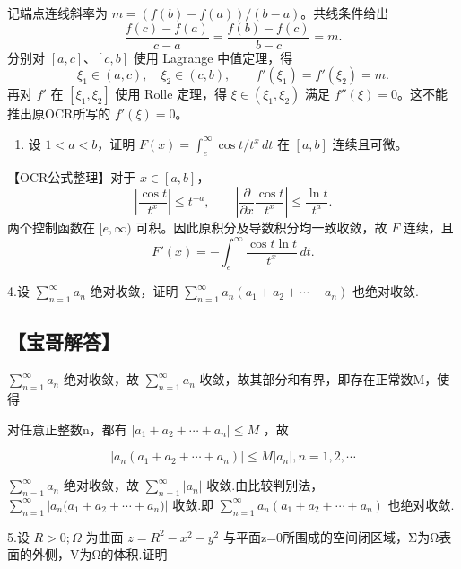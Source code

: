 \documentclass[11pt,fontset=fandol]{ctexart}
\providecommand{\tightlist}{\setlength{\itemsep}{0pt}\setlength{\parskip}{0pt}}
\begin{document}
记端点连线斜率为 \(m=(f(b)-f(a))/(b-a)\)。共线条件给出 \[
\frac{f(c)-f(a)}{c-a}=\frac{f(b)-f(c)}{b-c}=m.
\] 分别对 \([a,c]\)、\([c,b]\) 使用 Lagrange 中值定理，得 \[
\xi_1\in(a,c),\quad\xi_2\in(c,b),\qquad f'(\xi_1)=f'(\xi_2)=m.
\] 再对 \(f'\) 在 \([\xi_1,\xi_2]\) 使用 Rolle 定理，得
\(\xi\in(\xi_1,\xi_2)\) 满足 \(f''(\xi)=0\)。这不能推出原OCR所写的
\(f'(\xi)=0\)。

\begin{enumerate}
\def\labelenumi{\arabic{enumi}.}
\setcounter{enumi}{2}
\tightlist
\item
  设 \(1<a<b\)，证明 \(F(x)=\int_e^\infty\cos t/t^x\,dt\) 在 \([a,b]\)
  连续且可微。
\end{enumerate}

【OCR公式整理】对于 \(x\in[a,b]\)， \[
\left|\frac{\cos t}{t^x}\right|\le t^{-a},\qquad
\left|\frac{\partial}{\partial x}\frac{\cos t}{t^x}\right|
\le\frac{\ln t}{t^a}.
\] 两个控制函数在 \([e,\infty)\)
可积。因此原积分及导数积分均一致收敛，故 \(F\) 连续，且 \[
F'(x)=-\int_e^\infty\frac{\cos t\ln t}{t^x}\,dt.
\]

4.设 \(\sum _ { n = 1 } ^ { \infty } a _ { n }\) 绝对收敛，证明
\(\sum _ { n = 1 } ^ { \infty } a _ { n } ( a _ { 1 } + a _ { 2 } + \cdots + a _ { n } )\)
也绝对收敛.

\subsection{【宝哥解答】}\label{ux5b9dux54e5ux89e3ux7b54-2}

\(\sum _ { n = 1 } ^ { \infty } a _ { n }\) 绝对收敛，故
\(\sum _ { n = 1 } ^ { \infty } a _ { n }\)
收敛，故其部分和有界，即存在正常数M，使得

对任意正整数n，都有
\(\left| a _ { 1 } + a _ { 2 } + \cdots + a _ { n } \right| \leq M\)
，故

\[
\left| a _ { n } ( a _ { 1 } + a _ { 2 } + \cdots + a _ { n } ) \right| \leq M | a _ { n } { \big | } , n = 1 , 2 , \cdots
\]

\(\sum _ { n = 1 } ^ { \infty } a _ { n }\) 绝对收敛，故
\(\sum _ { n = 1 } ^ { \infty } \left| a _ { n } \right|\)
收敛.由比较判别法，
\(\sum _ { n = 1 } ^ { \infty } \left| a _ { n } { \big ( } a _ { 1 } + a _ { 2 } + \cdots + a _ { n } { \big ) } \right|\)
收敛.即
\(\sum _ { n = 1 } ^ { \infty } a _ { n } ( a _ { 1 } + a _ { 2 } + \cdots + a _ { n } )\)
也绝对收敛.

5.设 \(R > 0 ; \Omega\) 为曲面 \(z = R ^ { 2 } - x ^ { 2 } - y ^ { 2 }\)
与平面z=0所围成的空间闭区域，Σ为Ω表面的外侧，V为Ω的体积.证明
\end{document}
